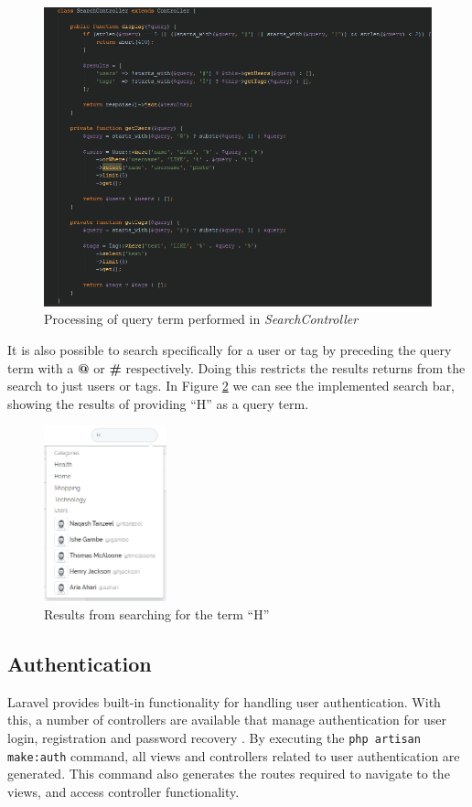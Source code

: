 \begin{figure}[H]
\centering
\includegraphics[width=1\textwidth]{Images/Implementation/SearchController}
\caption{Processing of query term performed in \textit{SearchController}}
\label{fig:SearchController}
\end{figure}

\noindent It is also possible to search specifically for a user or tag by preceding the query term with a \textbf{@} or \textbf{\#} respectively. Doing this restricts the results returns from the search to just users or tags. In Figure \ref{fig:SearchResults} we can see the implemented search bar, showing the results of providing ``H'' as a query term.

\begin{figure}[H]
\centering
\includegraphics[height=2in]{Images/Implementation/SearchResults}
\caption{Results from searching for the term ``H''}
\label{fig:SearchResults}
\end{figure}

\subsection{Authentication}
Laravel provides built-in functionality for handling user authentication. With this, a number of controllers are available that manage authentication for user login, registration and password recovery \cite{Laravel:Authentication}. By executing the \texttt{php artisan make:auth} command, all views and controllers related to user authentication are generated. This command also generates the routes required to navigate to the views, and access controller functionality.

